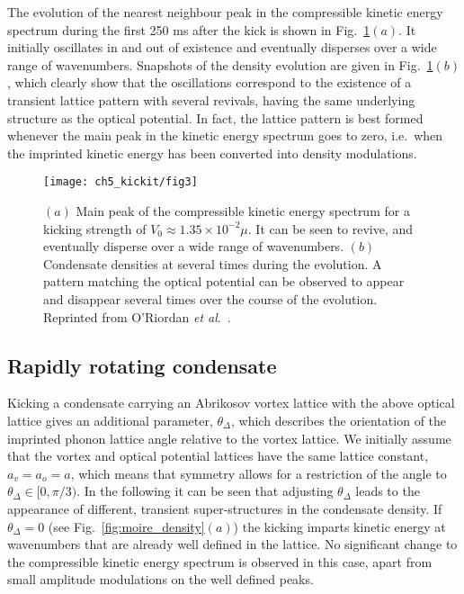 The evolution of the nearest neighbour peak in the compressible kinetic energy spectrum during the first 250 ms after the kick is shown in Fig.~\ref{fig:novtx_p5k}$(a)$. It initially oscillates in and out of existence and eventually disperses over a wide range of wavenumbers. Snapshots of the density evolution are given in Fig.~\ref{fig:novtx_p5k}$(b)$, which clearly show that the oscillations correspond to the existence of a transient lattice pattern with several revivals, having the same underlying structure as the optical potential. In fact, the lattice pattern is best formed whenever the main peak in the kinetic energy spectrum goes to zero, i.e.\ when the imprinted kinetic energy has been converted into density modulations.

\begin{figure}
    \centering
	\texttt{[image: ch5\_kickit/fig3]}
	\caption[Effect of kicking on non-rotating condensate.]{$(a)$ Main peak of the compressible kinetic energy spectrum for a kicking strength of $V_0 \approx 1.35\times10^{-2}\mu$. It can be seen to revive, and eventually disperse over a wide range of wavenumbers. $(b)$ Condensate densities at several times during the evolution. A pattern matching the optical potential can be observed to appear and disappear several times over the course of the evolution. Reprinted from O'Riordan {\textit{et al}.}~\cite{VTX:oriordan_pra_2016}.}
	\label{fig:novtx_p5k}
\end{figure}


\subsection{Rapidly rotating condensate}

    Kicking a condensate carrying an Abrikosov vortex lattice with the above optical lattice gives an additional parameter, $\theta_\Delta$, which describes the orientation of the imprinted phonon lattice angle relative to the vortex lattice. We initially assume that the vortex and optical potential lattices have the same lattice constant, $a_v=a_o=a$, which means that symmetry allows for a restriction of the angle to $\theta_\Delta\in[0,\pi/3)$. In the following it can be seen that adjusting $\theta_\Delta$ leads to the appearance of different, transient super-structures in the condensate density. If $\theta_\Delta=0$ (see Fig.~\ref{fig:moire_density}$(a)$) the kicking imparts kinetic energy at wavenumbers that are already well defined in the lattice. No significant change to the compressible kinetic energy spectrum is observed in this case, apart from small amplitude modulations on the well defined peaks.

